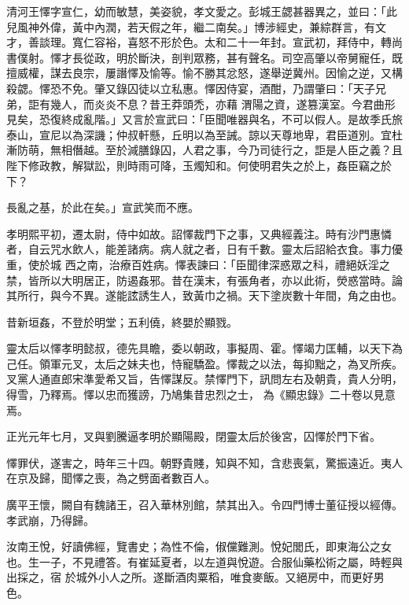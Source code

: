 \begin{pinyinscope}
 清河王懌字宣仁，幼而敏慧，美姿貌，孝文愛之。彭城王勰甚器異之，並曰：「此兒風神外偉，黃中內潤，若天假之年，繼二南矣。」博涉經史，兼綜群言，有文才，善談理。寬仁容裕，喜怒不形於色。太和二十一年封。宣武初，拜侍中，轉尚書僕射。懌才長從政，明於斷決，剖判眾務，甚有聲名。司空高肇以帝舅寵任，既擅威權，謀去良宗，屢譖懌及愉等。愉不勝其忿怒，遂舉逆冀州。因愉之逆，又構殺勰。懌恐不免。肇又錄囚徒以立私惠。懌因侍宴，酒酣，乃謂肇曰：「天子兄弟，詎有幾人，而炎炎不息？昔王莽頭禿，亦藉
 渭陽之資，遂篡漢室。今君曲形見矣，恐復終成亂階。」又言於宣武曰：「臣聞唯器與名，不可以假人。是故季氏旅泰山，宣尼以為深譏；仲叔軒懸，丘明以為至誡。諒以天尊地卑，君臣道別。宜杜漸防萌，無相僭越。至於減膳錄囚，人君之事，今乃司徒行之，詎是人臣之義？且陛下修政教，解獄訟，則時雨可降，玉燭知和。何使明君失之於上，姦臣竊之於下？



 長亂之基，於此在矣。」宣武笑而不應。



 孝明熙平初，遷太尉，侍中如故。詔懌裁門下之事，又典經義注。時有沙門惠憐者，自云咒水飲人，能差諸病。病人就之者，日有千數。靈太后詔給衣食。事力優重，使於城
 西之南，治療百姓病。懌表諫曰：「臣聞律深惑眾之科，禮絕妖淫之禁，皆所以大明居正，防遏姦邪。昔在漢末，有張角者，亦以此術，熒惑當時。論其所行，與今不異。遂能詃誘生人，致黃巾之禍。天下塗炭數十年間，角之由也。



 昔新垣姦，不登於明堂；五利僥，終嬰於顯戮。



 靈太后以懌孝明懿叔，德先具瞻，委以朝政，事擬周、霍。懌竭力匡輔，以天下為己任。領軍元叉，太后之妹夫也，恃寵驕盈。懌裁之以法，每抑黜之，為叉所疾。叉黨人通直郎宋準愛希又旨，告懌謀反。禁懌門下，訊問左右及朝貴，貴人分明，得雪，乃釋焉。懌以忠而獲謗，乃鳩集昔忠烈之士，
 為《顯忠錄》二十卷以見意焉。



 正光元年七月，叉與劉騰逼孝明於顯陽殿，閉靈太后於後宮，囚懌於門下省。



 懌罪伏，遂害之，時年三十四。朝野貴賤，知與不知，含悲喪氣，驚振遠近。夷人在京及歸，聞懌之喪，為之劈面者數百人。



 廣平王懷，闕自有魏諸王，召入華林別館，禁其出入。令四門博士董征授以經傳。孝武崩，乃得歸。



 汝南王悅，好讀佛經，覽書史；為性不倫，俶儻難測。悅妃閭氏，即東海公之女也。生一子，不見禮答。有崔延夏者，以左道與悅遊。合服仙藥松術之屬，時輕與出採之，宿
 於城外小人之所。遂斷酒肉粟稻，唯食麥飯。又絕房中，而更好男色。




\end{pinyinscope}
